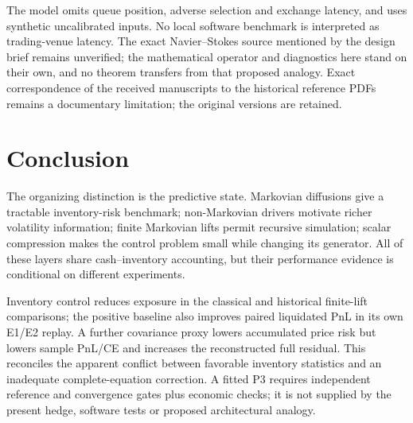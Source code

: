 The model omits queue position, adverse selection and exchange latency, and uses synthetic uncalibrated inputs. No local software benchmark is interpreted as trading-venue latency. The exact Navier--Stokes source mentioned by the design brief remains unverified; the mathematical operator and diagnostics here stand on their own, and no theorem transfers from that proposed analogy. Exact correspondence of the received manuscripts to the historical reference PDFs remains a documentary limitation; the original versions are retained.


\section*{Conclusion}
The organizing distinction is the predictive state. Markovian diffusions give a tractable inventory-risk benchmark; non-Markovian drivers motivate richer volatility information; finite Markovian lifts permit recursive simulation; scalar compression makes the control problem small while changing its generator. All of these layers share cash--inventory accounting, but their performance evidence is conditional on different experiments.

Inventory control reduces exposure in the classical and historical finite-lift comparisons; the positive baseline also improves paired liquidated PnL in its own E1/E2 replay. A further covariance proxy lowers accumulated price risk but lowers sample PnL/CE and increases the reconstructed full residual. This reconciles the apparent conflict between favorable inventory statistics and an inadequate complete-equation correction. A fitted P3 requires independent reference and convergence gates plus economic checks; it is not supplied by the present hedge, software tests or proposed architectural analogy.
